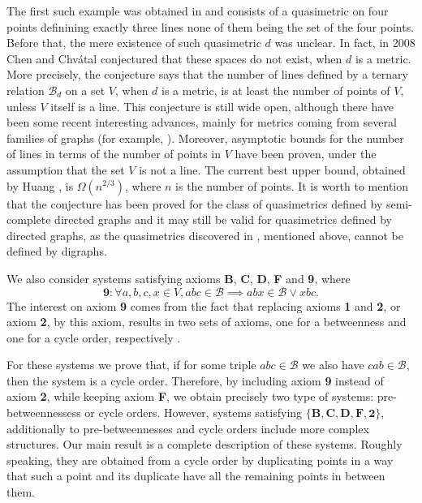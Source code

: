 \documentclass{article}
\newcommand{\calb}{\mathcal{B}}
\begin{document}
The first such example was obtained in \cite{armaza2023} and consists of a quasimetric on four points definining exactly three lines none of them being the set of the four points.  Before that, the mere existence of such quasimetric $d$ was unclear. In fact, in 2008 Chen and Chv\'{a}tal \cite{chenchvatal} conjectured that these spaces do not exist, when $d$ is a metric. More precisely, the conjecture says that the number of lines defined by a ternary relation  $\calb_d$ on a set $V$, when $d$ is a metric,  is at least the number of points of $V$, unless $V$ itself is a line.  This conjecture is still wide open, although there have been some recent interesting advances, mainly for metrics coming from several families of graphs (for example, \cite{abbemaza, abkha, beboch, bekharo, ch2014, kantor, jualrove}). Moreover, asymptotic bounds for the number of lines in terms of the number of points in $V$ have been proven, under the assumption that the set $V$ is not a line. The current best upper bound, obtained by Huang \cite{huang}, is $\Omega(n^{2/3})$, where $n$ is the number of points. It is worth to mention that the conjecture has been proved for the class of quasimetrics defined by semi-complete directed graphs \cite{arma2021,armaza2023sc} and it may still be valid for quasimetrics defined by directed graphs, as the quasimetrics discovered in \cite{armaza2023sc,gamaza2024}, mentioned above, cannot be defined by digraphs.


We also consider systems satisfying axioms \textbf{B}, \textbf{C},  \textbf{D}, \textbf{F} and \textbf{9}, where $$\textbf{9}: \forall a,b,c,x\in V, abc\in\calb\implies abx\in\calb\lor xbc.$$  The interest on axiom \textbf{9} comes from the fact that replacing axioms \textbf{1} and \textbf{2}, or axiom \textbf{2}, by this axiom, results in two sets of axioms, one for a betweenness and one for a cycle order, respectively \cite{huntkline,hunt1935}.
 

For these systems we prove that, if for some triple $abc\in\calb$ we also have $cab\in\calb$, then the system is a cycle order. Therefore, by including axiom \textbf{9} instead of axiom \textbf{2}, while keeping axiom \textbf{F}, we obtain precisely two type of systems: pre-betweennessess or cycle orders. However, systems satisfying $\{\textbf{B}, \textbf{C},\textbf{D}, \textbf{F},\textbf{2}\}$, additionally to pre-betweennesses and cycle orders include more complex structures. Our main result is a complete description of these systems. Roughly speaking, they are obtained from a cycle order by duplicating points in a way that such a point and its duplicate have all the remaining points in between them. 
\end{document}
